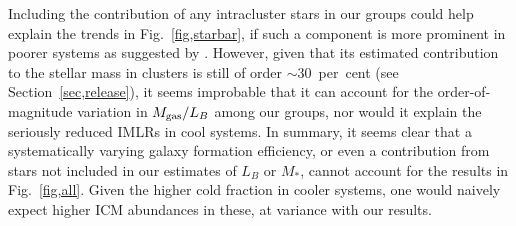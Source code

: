 \documentclass[useAMS,usenatbib]{mn2e}
\begin{document}
Including the contribution of any intracluster stars in our groups
could help explain the trends in Fig.~\ref{fig,starbar}, if such a
component is more prominent in poorer systems as suggested by
\citet{gonz07}. However, given that its estimated contribution to the
stellar mass in clusters is still of order $\sim 30$~per~cent (see
Section~\ref{sec,release}), it seems improbable that it can account
for the order-of-magnitude variation in $M_{\rm gas}/L_B$ among our
groups, nor would it explain the seriously reduced IMLRs in cool
systems. In summary, it seems clear that a systematically varying
galaxy formation efficiency, or even a contribution from stars not
included in our estimates of $L_B$ or $M_\ast$, cannot account for the
results in Fig.~\ref{fig,all}. Given the higher cold fraction in
cooler systems, one would naively expect higher ICM abundances in
these, at variance with our results.
\end{document}

